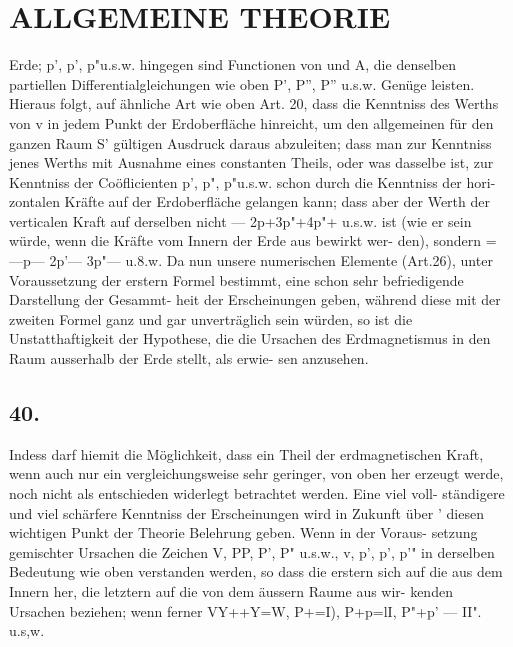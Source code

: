 \documentclass[12pt,a4paper]{article}
\begin{document}
\newpage


\section*{ALLGEMEINE THEORIE}
Erde; p', p', p"u.s.w. hingegen sind Functionen von \guillemotleft{} und A, die denselben partiellen Differentialgleichungen wie oben P', P'', P'' u.s.w. Genüge leisten. Hieraus folgt, auf ähnliche Art wie oben Art. 20, dass die Kenntniss des Werths von v in jedem Punkt der Erdoberfläche hinreicht, um den allgemeinen für den ganzen Raum S' gültigen Ausdruck daraus abzuleiten; dass man zur Kenntniss jenes Werths mit Ausnahme eines constanten Theils, oder was dasselbe ist, zur Kenntniss der Coöflicienten p', p", p"u.s.w. schon durch die Kenntniss der hori- zontalen Kräfte auf der Erdoberfläche gelangen kann; dass aber der Werth der verticalen Kraft auf derselben nicht --- 2p+3p"+4p"+ u.s.w. ist (wie er sein würde, wenn die Kräfte vom Innern der Erde aus bewirkt wer- den), sondern = ---p--- 2p'--- 3p"--- u.8.w. Da nun unsere numerischen Elemente (Art.26), unter Voraussetzung der erstern Formel bestimmt, eine schon sehr befriedigende Darstellung der Gesammt- heit der Erscheinungen geben, während diese mit der zweiten Formel ganz und gar unverträglich sein würden, so ist die Unstatthaftigkeit der Hypothese, die die Ursachen des Erdmagnetismus in den Raum ausserhalb der Erde stellt, als erwie- sen anzusehen.

\subsection*{40.}
Indess darf hiemit die Möglichkeit, dass ein Theil der erdmagnetischen Kraft, wenn auch nur ein vergleichungsweise sehr geringer, von oben her erzeugt werde, noch nicht als entschieden widerlegt betrachtet werden. Eine viel voll- ständigere und viel schärfere Kenntniss der Erscheinungen wird in Zukunft über ' diesen wichtigen Punkt der Theorie Belehrung geben. Wenn in der Voraus- setzung gemischter Ursachen die Zeichen V, PP, P', P" u.s.w., v, p', p', p'" in derselben Bedeutung wie oben verstanden werden, so dass die erstern sich auf die aus dem Innern her, die letztern auf die von dem äussern Raume aus wir- kenden Ursachen beziehen; wenn ferner VY++Y=W, P+=I), P+p=lI, P"+p' --- II". u.s,w.


\newpage
\end{document}
